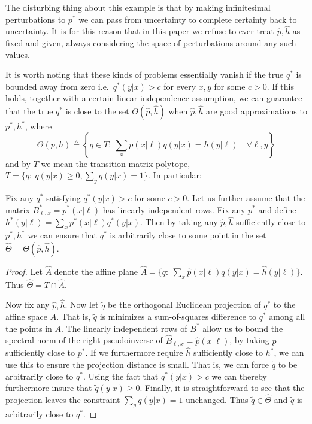 The disturbing thing about this example is that by making infinitesimal perturbations to $p^*$ we can pass from uncertainty to complete certainty back to uncertainty.  It is for this reason that in this paper we refuse to ever treat $\hat p,\hat h$ as fixed and given, always considering the space of perturbations around any such values.  

It is worth noting that these kinds of problems essentially vanish if the true $q^*$ is bounded away from zero i.e.\ $q^*(y|x)>c$ for every $x,y$ for some $c>0$.  If this holds, together with a certain linear independence assumption, we can guarantee that the true $q^*$ is close to the set $\Theta(\hat p,\hat h)$ when $\hat p,\hat h$ are good approximations to $p^*,h^*$, where
\[
\Theta(p,h) \triangleq \left\{q\in T:\ \sum_x p(x|\ell)q(y|x)= h(y|\ell) \quad \forall \ell,y \right\}
\]
and by $T$ we mean the transition matrix polytope, $T=\{q:\ q(y|x)\geq 0, \sum_y q(y|x)=1\}$.  In particular:\vspace{.1in}

\begin{thm}\label{thm:mainthm}
Fix any $q^*$ satisfying $q^*(y|x)>c$ for some $c>0$.  Let us further assume that the matrix $B^*_{\ell,x}=p^*(x|\ell)$ has linearly independent rows.  Fix any $p^*$ and define $h^*(y|\ell)=\sum_x p^*(x|\ell)q^*(y|x)$.  Then by taking any $\hat p,\hat h$ sufficiently close to $p^*,h^*$ we can ensure that $q^*$ is arbitrarily close to some point in the set $\hat \Theta = \Theta(\hat p,\hat h)$.
\end{thm}
\begin{proof}
Let $\hat A$ denote the affine plane $\hat A=\{q:\ \sum_x \hat p(x|\ell)q(y|x)= \hat  h(y|\ell)\}$.  Thus $\hat \Theta = T \cap \hat A$.

Now fix any $\hat p,\hat h$.  Now let $\tilde q$ be the orthogonal Euclidean projection of $q^*$ to the affine space $A$.  That is, $\tilde q$ is minimizes a sum-of-squares difference to $q^*$ among all the points in $A$.  The linearly independent rows of $B^*$ allow us to bound the spectral norm of the right-pseudoinverse of $\hat B_{\ell,x}=\hat p(x|\ell)$, by taking $\hat p$ sufficiently close to $p^*$.  If we furthermore require $\hat h$ sufficiently close to $h^*$, we can use this to ensure the projection distance is small.  That is, we can force $\tilde q$ to be arbitrarily close to $q^*$.  Using the fact that $q^*(y|x)>c$ we can thereby furthermore insure that $\tilde q(y|x)\geq0$.  Finally, it is straightforward to see that the projection leaves the constraint $\sum_y q(y|x)=1$ unchanged.  Thus $\tilde q\in \hat \Theta$ and $\tilde q$ is arbitrarily close to $q^*$. 
\end{proof}

